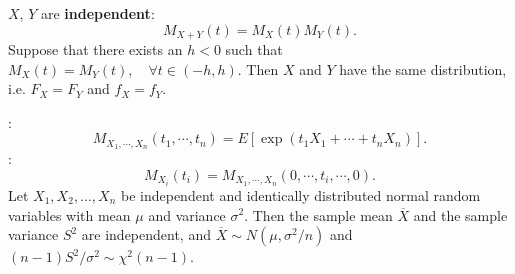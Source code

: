  \(X\), \(Y\) are \textbf{independent}:
\[M_{X+Y}(t) = M_X(t)M_Y(t).\]
 Suppose that there exists an \(h < 0\) such
that
\(M_X(t) = M_Y(t), \quad \forall t \in (-h, h).\)
Then \(X\) and \(Y\) have the same distribution, i.e. \(F_X = F_Y\) and 
\(f_X = f_Y\).

:
\[M_{X_1, \cdots, X_n}(t_1, \cdots, t_n) = E\left[\exp({t_1X_1 + \cdots +
t_nX_n})\right].\]
:
\[M_{X_i}(t_i) = M_{X_1, \cdots, X_n}(0, \cdots, t_i, \cdots, 0).\]
Let \(X_1, X_2, \ldots, X_n\) be independent and identically distributed normal
random variables with mean \(\mu\) and variance \(\sigma^2\). Then the sample
mean \(\overline{X}\) and the sample variance \(S^2\) are independent, and
\(\overline{X}\sim N\left(\mu, \sigma^2/n\right)\) and \((n-1)S^2/\sigma^2
\sim \chi^2(n-1)\).

